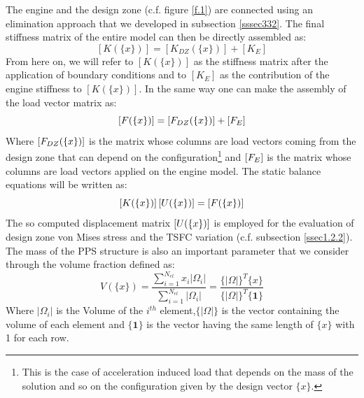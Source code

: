  The engine and the design zone (c.f. figure \ref{f.1}) are connected using an elimination approach that we developed in subsection \ref{sssec332}. The final stiffness matrix of the entire model can then be directly assembled as:
 \begin{equation}
 \label{eq.9}
 \left[K(\lbrace x\rbrace)\right]=\left[K_{DZ}(\lbrace x\rbrace)\right] + \left[K_{E}\right]
 \end{equation}
 From here on, we will refer to $\left[K(\lbrace x\rbrace)\right]$ as the stiffness matrix after the application of boundary conditions and to $\left[K_{E}\right]$ as the contribution of the engine stiffness to  $\left[K(\lbrace x\rbrace)\right]$.
 In the same way one can make the assembly of the load vector matrix as:
 \begin{equation}
 \label{eq.10}
  \left[{F(\lbrace x\rbrace)}\right] = \left[{ F_{DZ}(\lbrace x\rbrace)}\right]+ \left[{ F_{E} }\right]
 \end{equation}
 Where $\left[{ F_{DZ}(\lbrace x\rbrace) }\right] $ is the matrix whose columns are load vectors coming from the design zone that can depend on the configuration\footnote{This is the case of acceleration induced load that depends on the mass of the solution and so on the configuration given by the design vector $\lbrace x\rbrace$.} and $\left[{ F_{E} }\right] $ is the matrix whose columns are load vectors applied on the engine model.
 The static balance equations will be written as:
 \begin{equation}
 \label{sbeq}
 \left[K(\lbrace x\rbrace)\right]\left[{ U (\lbrace x\rbrace) }\right] = \left[{ F(\lbrace x\rbrace)}\right]
 \end{equation}
 The so computed displacement matrix $\left[{ U (\lbrace x\rbrace)}\right]$ is employed for the evaluation of design zone von Mises stress and  the TSFC variation (c.f. subsection \ref{ssec1.2.2}).
 The mass of the PPS structure is also an important parameter that we consider through the volume fraction defined as:
 \begin{equation}
 \label{eq.12}
 V\left(\lbrace x\rbrace\right)=\frac{\sum_{i=1}^{N_{el}}x_i|\Omega_i|}{\sum_{i=1}^{N_{el}}|\Omega_i|}=\frac{\lbrace|\Omega|\rbrace^T\lbrace x\rbrace }{\lbrace|\Omega|\rbrace^T\lbrace \mathbf{1}\rbrace}
 \end{equation}
 Where $|\Omega_i|$ is the Volume of the $i^{th}$ element,$\lbrace|\Omega|\rbrace$ is the vector containing the volume of each element and $\lbrace \mathbf{1}\rbrace$ is the vector having the same length of $\lbrace x\rbrace$ with 1 for each row.
